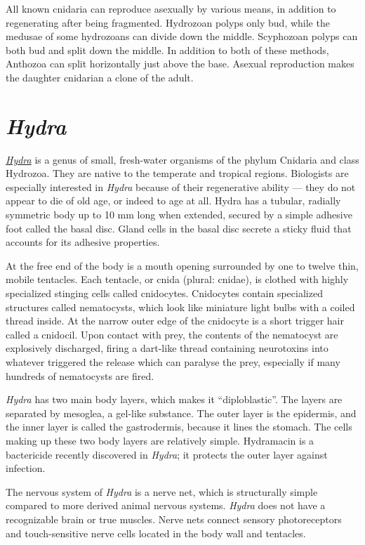All known cnidaria can reproduce asexually by various means, in addition
to regenerating after being fragmented. Hydrozoan polyps only bud, while
the medusae of some hydrozoans can divide down the middle. Scyphozoan
polyps can both bud and split down the middle. In addition to both of
these methods, Anthozoa can split horizontally just above the base.
Asexual reproduction makes the daughter cnidarian a clone of the adult.

\section{\texorpdfstring{\emph{Hydra}}{Hydra}}\label{hydra}

\href{https://en.wikipedia.org/wiki/Hydra_(genus)}{\emph{Hydra}} is a
genus of small, fresh-water organisms of the phylum Cnidaria and class
Hydrozoa. They are native to the temperate and tropical regions.
Biologists are especially interested in \emph{Hydra} because of their
regenerative ability --- they do not appear to die of old age, or indeed
to age at all. Hydra has a tubular, radially symmetric body up to 10 mm
long when extended, secured by a simple adhesive foot called the basal
disc. Gland cells in the basal disc secrete a sticky fluid that accounts
for its adhesive properties.

At the free end of the body is a mouth opening surrounded by one to
twelve thin, mobile tentacles. Each tentacle, or cnida (plural: cnidae),
is clothed with highly specialized stinging cells called cnidocytes.
Cnidocytes contain specialized structures called nematocysts, which look
like miniature light bulbs with a coiled thread inside. At the narrow
outer edge of the cnidocyte is a short trigger hair called a cnidocil.
Upon contact with prey, the contents of the nematocyst are explosively
discharged, firing a dart-like thread containing neurotoxins into
whatever triggered the release which can paralyse the prey, especially
if many hundreds of nematocysts are fired.

\emph{Hydra} has two main body layers, which makes it ``diploblastic''.
The layers are separated by mesoglea, a gel-like substance. The outer
layer is the epidermis, and the inner layer is called the gastrodermis,
because it lines the stomach. The cells making up these two body layers
are relatively simple. Hydramacin is a bactericide recently discovered
in \emph{Hydra}; it protects the outer layer against infection.

The nervous system of \emph{\emph{Hydra}} is a nerve net, which is structurally
simple compared to more derived animal nervous systems. \emph{Hydra}
does not have a recognizable brain or true muscles. Nerve nets connect
sensory photoreceptors and touch-sensitive nerve cells located in the
body wall and tentacles.

